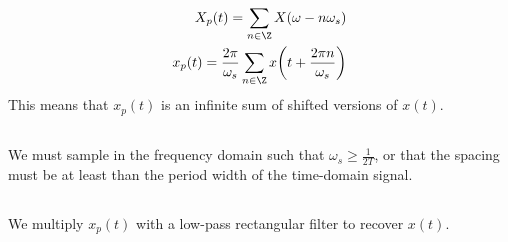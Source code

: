 \documentclass{article}
\begin{document}
\subsection{}

\begin{align}
    X_p(t) = \sum_{n \in \Z} X(\omega - n\omega_s) \\
    x_p(t) = \frac{2\pi}{\omega_s} \sum_{n \in \Z} x\qty(t + \frac{2\pi n}{\omega_s})
\end{align}
This means that \(x_p(t)\) is an infinite sum of shifted versions of \(x(t)\).

\subsection{}

We must sample in the frequency domain such that \(\omega_s \geqslant \frac{1}{2T}\), or that the spacing must be at least than the period width of the time-domain signal.

\subsection{}

We multiply \(x_p(t)\) with a low-pass rectangular filter to recover \(x(t)\).
\end{document}
